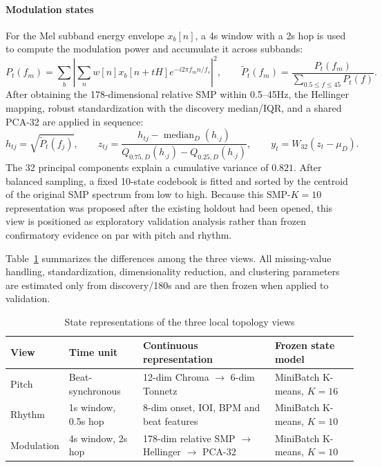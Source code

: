 \documentclass{article}
\begin{document}
\paragraph{Modulation states}
For the Mel subband energy envelope $x_b[n]$, a 4s window with a 2s hop is used to compute the modulation power and accumulate it across subbands:
\[
P_t(f_m)=\sum_b\left|\sum_n w[n]x_b[n+tH]e^{-i2\pi f_mn/f_s}\right|^2,
\qquad
\widetilde P_t(f_m)=\frac{P_t(f_m)}{\sum_{0.5\le f\le45}P_t(f)}.
\]
After obtaining the 178-dimensional relative SMP within 0.5--45Hz, the Hellinger mapping, robust standardization with the discovery median/IQR, and a shared PCA-32 are applied in sequence:
\[
h_{tj}=\sqrt{\widetilde P_t(f_j)},\qquad
z_{tj}=\frac{h_{tj}-\operatorname{median}_D(h_{\cdot j})}
{Q_{0.75,D}(h_{\cdot j})-Q_{0.25,D}(h_{\cdot j})},
\qquad y_t=W_{32}(z_t-\mu_D).
\]
The 32 principal components explain a cumulative variance of $0.821$. After balanced sampling, a fixed 10-state codebook is fitted and sorted by the centroid of the original SMP spectrum from low to high. Because this SMP-$K=10$ representation was proposed after the existing holdout had been opened, this view is positioned as exploratory validation analysis rather than frozen confirmatory evidence on par with pitch and rhythm.

Table~\ref{tab:local_view_representations} summarizes the differences among the three views. All missing-value handling, standardization, dimensionality reduction, and clustering parameters are estimated only from discovery/180s and are then frozen when applied to validation.

\begin{table}[htbp]
\centering
\setlength{\tabcolsep}{4pt}
\caption{State representations of the three local topology views}
\label{tab:local_view_representations}
\renewcommand{\arraystretch}{1.5}
\begin{tabular}{llll}
\toprule
View & Time unit & Continuous representation & Frozen state model \\
\midrule
Pitch & Beat-synchronous & 12-dim Chroma $\rightarrow$ 6-dim Tonnetz & MiniBatch K-means, $K=16$ \\
Rhythm & 1s window, 0.5s hop & 8-dim onset, IOI, BPM and beat features & MiniBatch K-means, $K=10$ \\
Modulation & 4s window, 2s hop & 178-dim relative SMP $\rightarrow$ Hellinger $\rightarrow$ PCA-32 & MiniBatch K-means, $K=10$ \\
\bottomrule
\end{tabular}
\end{table}
\end{document}
